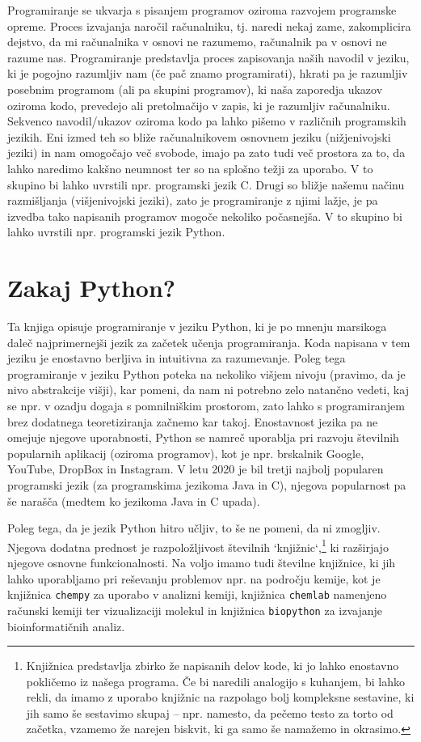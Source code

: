 Programiranje se ukvarja s pisanjem programov oziroma razvojem programske opreme. Proces izvajanja naročil računalniku, tj. naredi nekaj zame, zakomplicira dejstvo, da mi računalnika v osnovi ne razumemo, računalnik pa v osnovi ne razume nas. Programiranje predstavlja proces zapisovanja naših navodil v jeziku, ki je pogojno razumljiv nam (če pač znamo programirati), hkrati pa je razumljiv posebnim programom (ali pa skupini programov), ki naša zaporedja ukazov oziroma kodo, prevedejo  ali pretolmačijo  v zapis, ki je razumljiv računalniku. 
Sekvenco navodil/ukazov oziroma kodo pa lahko pišemo v različnih programskih jezikih. Eni izmed teh so bliže računalnikovem osnovnem jeziku (nižjenivojski jeziki) in nam omogočajo več svobode, imajo pa zato tudi več prostora za to, da lahko naredimo kakšno neumnost ter so na splošno težji za uporabo. V to skupino bi lahko uvrstili npr. programski jezik C. Drugi so bližje našemu načinu razmišljanja (višjenivojski jeziki), zato je programiranje z njimi lažje, je pa izvedba tako napisanih programov mogoče nekoliko počasnejša. V to skupino bi lahko uvrstili npr. programski jezik Python.

\section{Zakaj Python?}

Ta knjiga opisuje programiranje v jeziku Python, ki je po mnenju marsikoga daleč najprimernejši jezik za začetek učenja programiranja. Koda napisana v tem jeziku je enostavno berljiva in intuitivna za razumevanje. Poleg tega programiranje v jeziku Python poteka na nekoliko višjem nivoju (pravimo, da je nivo abstrakcije višji), kar pomeni, da nam ni potrebno zelo natančno vedeti, kaj se npr. v ozadju dogaja s pomnilniškim prostorom, zato lahko s programiranjem brez dodatnega teoretiziranja začnemo kar takoj. Enostavnost jezika pa ne omejuje njegove uporabnosti, Python se namreč uporablja pri razvoju številnih popularnih aplikacij (oziroma programov), kot je npr. brskalnik Google, YouTube, DropBox in Instagram. V letu 2020 je bil tretji najbolj popularen programski jezik (za programskima jezikoma Java in C), njegova popularnost pa še narašča (medtem ko jezikoma Java in C upada). 

Poleg tega, da je jezik Python hitro učljiv, to še ne pomeni, da ni zmogljiv. Njegova dodatna prednost je razpoložljivost številnih `knjižnic`,\footnote{Knjižnica predstavlja zbirko že napisanih delov kode, ki jo lahko enostavno pokličemo iz našega programa. Če bi naredili analogijo s kuhanjem, bi lahko rekli, da imamo z uporabo knjižnic na razpolago bolj kompleksne sestavine, ki jih samo še sestavimo skupaj -- npr. namesto, da pečemo testo za torto od začetka, vzamemo že narejen biskvit, ki ga samo še namažemo in okrasimo.} ki razširjajo njegove osnovne funkcionalnosti. Na voljo imamo tudi številne knjižnice, ki jih lahko uporabljamo pri reševanju problemov npr. na področju kemije, kot je knjižnica \texttt{chempy} za uporabo v analizni kemiji, knjižnica \texttt{chemlab} namenjeno računski kemiji ter vizualizaciji molekul in knjižnica \texttt{biopython} za izvajanje bioinformatičnih analiz.

